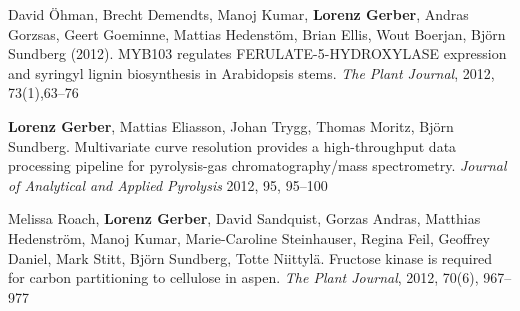 \documentclass[10pt]{article}
\begin{document}
\begin{bibenum}
                                                                                           \item David \"{O}hman, Brecht Demendts, Manoj Kumar,
                                                                                             \textbf{Lorenz Gerber}, Andras Gorzsas, Geert Goeminne,
                                                                                             Mattias Hedenst\"{o}m, Brian Ellis, Wout Boerjan, Bj\"{o}rn Sundberg (2012).
                                                                                             MYB103 regulates FERULATE-5-HYDROXYLASE expression and
                                                                                             syringyl lignin biosynthesis in Arabidopsis stems.
                                                                                             \emph{The Plant Journal}, 2012, 73(1),63--76\\


                                                                                           \item \textbf{Lorenz Gerber}, Mattias Eliasson, Johan Trygg,
                                                                                             Thomas Moritz, Bj\"{o}rn Sundberg. Multivariate curve
                                                                                             resolution provides a high-throughput data processing pipeline
                                                                                             for pyrolysis-gas chromatography/mass spectrometry.
                                                                                             \emph{Journal of Analytical and Applied Pyrolysis} 2012, 95, 95--100\\


                                                                                           \item Melissa Roach, \textbf{Lorenz Gerber}, David Sandquist,
                                                                                             Gorzas Andras, Matthias Hedenstr\"{o}m, Manoj Kumar,
                                                                                             Marie-Caroline Steinhauser, Regina Feil, Geoffrey Daniel,
                                                                                             Mark Stitt, Bj\"{o}rn Sundberg, Totte Niittyl\"{a}.
                                                                                             Fructose kinase is required for carbon partitioning to
                                                                                             cellulose in aspen. \emph{The Plant Journal}, 2012, 70(6), 967--977\\


\end{bibenum}
\end{document}
